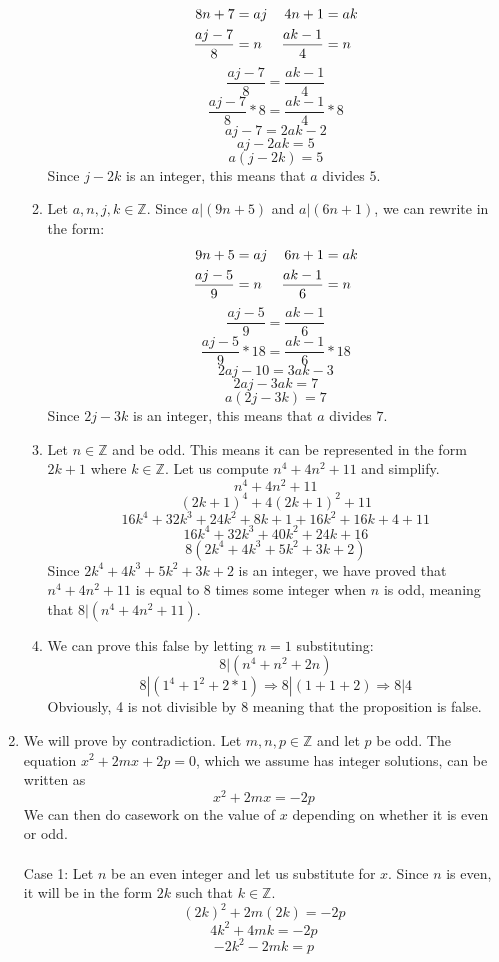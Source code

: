 \documentclass{article}
\begin{document}
\begin{enumerate}[label=\textbf{\arabic*}.]
\begin{enumerate}[label=\textbf{\alph*}.]
\begin{align}
            8n+7 &= aj   &   4n+1 &= ak \\ \notag
            \frac{aj-7}{8} &= n &  \frac{ak-1}{4} &= n
        \end{align}
        \[\frac{aj-7}{8} = \frac{ak-1}{4}\]
        \[\frac{aj-7}{8}*8 = \frac{ak-1}{4}*8\]
        \[aj-7=2ak-2\]
        \[aj-2ak=5\]
        \[a(j-2k)=5\]
        Since $j-2k$ is an integer, this means that $a$ divides $5$.
        \item Let $a,n,j,k \in \mathbb{Z}$. Since $a|(9n+5)$ and $a|(6n+1)$, we can rewrite in the form: 
        \begin{align}\notag
            9n+5 &= aj   &   6n+1 &= ak \\ \notag
            \frac{aj-5}{9} &= n &  \frac{ak-1}{6} &= n
        \end{align}
        \[\frac{aj-5}{9} = \frac{ak-1}{6}\]
        \[\frac{aj-5}{9}*18 = \frac{ak-1}{6}*18\]
        \[2aj-10=3ak-3\]
        \[2aj-3ak=7\]
        \[a(2j-3k)=7\]
        Since $2j-3k$ is an integer, this means that $a$ divides $7$.
        \item Let $n \in \mathbb{Z}$ and be odd. This means it can be represented in the form $2k+1$ where $k \in \mathbb{Z}$. Let us compute $n^4+4n^2+11$ and simplify.
        \[n^4+4n^2+11\]
        \[(2k+1)^4+4(2k+1)^2+11\]
        \[16k^4+32k^3+24k^2+8k+1+16k^2+16k+4+11\]
        \[16k^4+32k^3+40k^2+24k+16\]
        \[8(2k^4+4k^3+5k^2+3k+2)\]
        Since $2k^4+4k^3+5k^2+3k+2$ is an integer, we have proved that $n^4+4n^2+11$ is equal to $8$ times some integer when $n$ is odd, meaning that $8|(n^4+4n^2+11)$.
        \item We can prove this false by letting $n=1$ substituting:
        \[8|(n^4+n^2+2n)\]
        \[8|(1^4+1^2+2*1) \Rightarrow 8|(1+1+2) \Rightarrow 8|4\]
        Obviously, 4 is not divisible by 8 meaning that the proposition is false.
    \end{enumerate}
    \item We will prove by contradiction. Let $m,n,p \in \mathbb{Z}$ and let $p$ be odd. The equation $x^2+2mx+2p=0$, which we assume has integer solutions, can be written as
    \[x^2+2mx=-2p\]
    We can then do casework on the value of $x$ depending on whether it is even or odd. \\\\
    Case 1: Let $n$ be an even integer and let us substitute for $x$. Since $n$ is even, it will be in the form $2k$ such that $k \in \mathbb{Z}$.
    \[(2k)^2+2m(2k)=-2p\]
    \[4k^2+4mk=-2p\]
    \[-2k^2-2mk=p\]

\end{enumerate}
\end{document}

